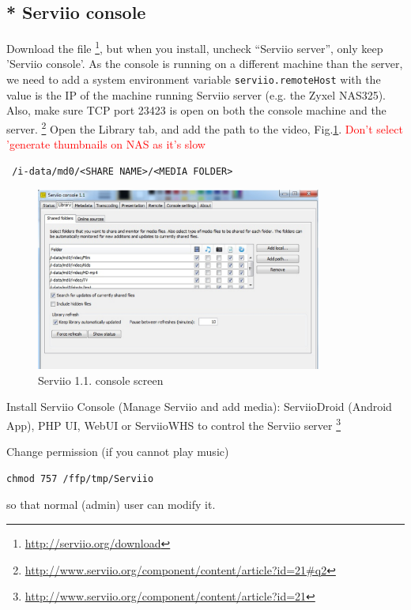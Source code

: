 


\subsection{* Serviio console}
\label{sec:serviio_console}

Download the file \footnote{\url{http://serviio.org/download}}, but
when you install, uncheck ``Serviio server'', only keep 'Serviio console'. As
the console is running on a different machine than the server, we need to add a
system environment variable \verb!serviio.remoteHost! with the value is the IP
of the machine running Serviio server (e.g. the Zyxel NAS325). Also, make sure
TCP port 23423 is open on both the console machine and the server.
\footnote{\url{http://www.serviio.org/component/content/article?id=21\#q2}}
Open the Library tab, and add the path to the video,
Fig.\ref{fig:Serviio_1_1_console}. \textcolor{red}{Don't select 'generate
thumbnails on NAS as it's slow}
\begin{verbatim}
 /i-data/md0/<SHARE NAME>/<MEDIA FOLDER>
\end{verbatim}

\begin{figure}[hbt]
  \centerline{\includegraphics[height=6cm,
    angle=0]{./images/Serviio_1_1_console.eps}}
  \caption{Serviio 1.1. console screen}
  \label{fig:Serviio_1_1_console}
\end{figure}


Install Serviio Console (Manage Serviio and add media): ServiioDroid (Android
App), PHP UI, WebUI or ServiioWHS to control the Serviio server
\footnote{\url{http://www.serviio.org/component/content/article?id=21}}

Change permission (if you cannot play music)
\begin{verbatim}
chmod 757 /ffp/tmp/Serviio
\end{verbatim}
so that normal (admin) user can modify it.


